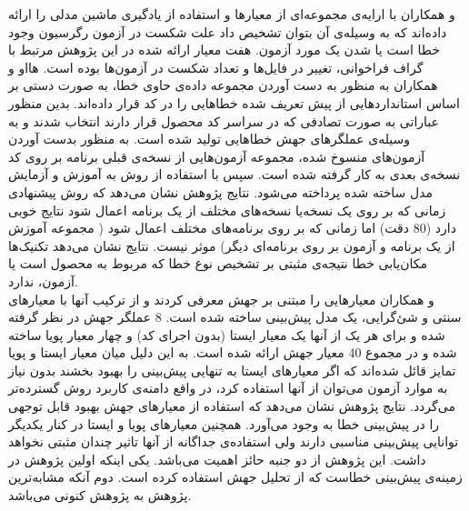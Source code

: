  و همکاران با ارایه‌ی مجموعه‌ای از معیارها و استفاده از یادگیری ماشین مدلی را ارائه داده‌اند که به وسیله‌ی آن بتوان تشخیص داد علت شکست در آزمون رگرسیون وجود خطا است یا  شدن یک مورد آزمون\cite{hao2013bug}. هفت معیار ارائه شده در این پژوهش مرتبط با گراف فراخوانی، تغییر در فایل‌ها و تعداد شکست در آزمون‌ها بوده است.  هااو و همکاران به منظور به دست آوردن مجموعه داده‌ی حاوی خطا، به صورت دستی بر اساس استانداردهایی  از پیش تعریف شده خطاهایی را در کد قرار داده‌اند. بدین منظور عباراتی به صورت تصادفی که در سراسر کد محصول قرار دارند انتخاب شدند و به وسیله‌ی عملگرهای جهش خطاهایی تولید شده است. به منظور بدست آوردن آزمون‌های منسوخ شده، مجموعه آزمون‌هایی از نسخه‌ی قبلی برنامه بر روی کد  نسخه‌ی بعدی به کار گرفته شده است. سپس با استفاده از روش  به آموزش و آزمایش مدل ساخته شده پرداخته می‌شود. نتایج پژوهش نشان می‌دهد که روش پیشنهادی زمانی که بر روی یک نسخه‌یا نسخه‌های مختلف از یک برنامه اعمال شود نتایج خوبی دارد (80\lr{\%} دقت) اما زمانی که بر روی برنامه‌های مختلف اعمال شود ( مجموعه آموزش از یک برنامه و آزمون بر روی برنامه‌ای دیگر) موثر نیست. نتایج نشان می‌دهد تکنیک‌ها مکان‌یابی خطا نتیجه‌ی مثبتی بر تشخیص نوع خطا که مربوط به محصول است یا آزمون، ندارد.\\
 
 و همکاران معیارهایی را مبتنی بر جهش معرفی کردند و  از ترکیب آنها با معیارهای سنتی و شئ‌گرایی، یک مدل پیش‌بینی ساخته شده است\cite{bowes2016mutation}. 8 عملگر جهش در نظر گرفته شده و برای هر یک از آنها یک معیار ایستا (بدون اجرای کد) و چهار معیار پویا ساخته شده و در مجموع 40 معیار جهش ارائه شده است. به این دلیل میان معیار ایستا و پویا تمایز قائل شده‌اند که اگر معیارهای ایستا به تنهایی  پیش‌بینی را بهبود بخشند بدون نیاز به موارد آزمون می‌توان از آنها استفاده کرد، در واقع دامنه‌ی کاربرد روش گسترده‌تر می‌گردد. نتایج پژوهش نشان می‌دهد که استفاده از معیارهای جهش بهبود قابل توجهی را در پیش‌بینی خطا به وجود می‌آورد. همچنین معیارهای پویا و ایستا در کنار یکدیگر توانایی پیش‌بینی مناسبی دارند ولی استفاده‌ی جداگانه از آنها تاثیر چندان مثبتی نخواهد داشت. این پژوهش از دو جنبه حائز اهمیت می‌باشد. یکی اینکه اولین پژوهش در زمینه‌ی پیش‌بینی خطاست که از تحلیل جهش استفاده کرده است. دوم آنکه مشابه‌ترین پژوهش به پژوهش کنونی می‌باشد. 
 
 
 
 
 
 
 
 
 
 
 
 
 
 
 
 
 
 
 
 
 

